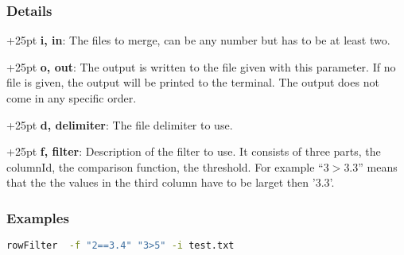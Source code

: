 \documentclass[a4paper,10pt,parskip=half]{scrreprt}
\begin{document}
\subsubsection{Details}
\hangindent+25pt 
\textbf{i, in}: The files to merge, can be any number but has to be at least
two.

\hangindent+25pt 
\textbf{o, out}: The output is written to the file given with this parameter. If
no file is given, the output will be printed to the terminal. The output does
not come in any specific order.

\hangindent+25pt 
\textbf{d, delimiter}: The file delimiter to use. 

\hangindent+25pt 
\textbf{f, filter}: Description of the filter to use. It consists of three parts, the columnId, the comparison function, the threshold. For example ``3$>$3.3'' means that the the values in the third column have to be larget then '3.3'.



\subsubsection*{Examples}
\begin{lstlisting}[language=bash,frame=none,morekeywords={PROMPT}]
 rowFilter  -f "2==3.4" "3>5" -i test.txt
\end{lstlisting}
\end{document}
